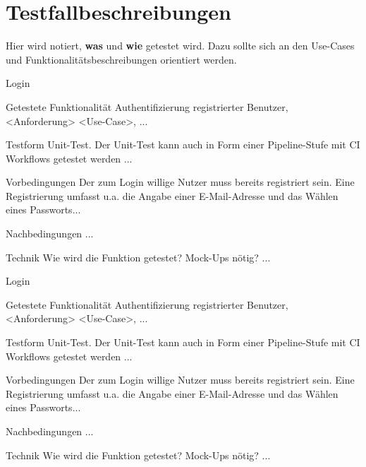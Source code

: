 \chapter{Testfallbeschreibungen}
\label{chap:test}

Hier wird notiert, \textbf{was} und \textbf{wie} getestet wird. Dazu sollte sich an den Use-Cases und Funktionalitätsbeschreibungen orientiert werden.

\begin{testcase}{10}{Login}
  \item[Getestete Funktionalität] Authentifizierung registrierter Benutzer, <Anforderung> <Use-Case>, ...
  \item[Testform] Unit-Test. Der Unit-Test kann auch in Form einer Pipeline-Stufe mit \gls{CI} Workflows getestet werden ...
  \item[Vorbedingungen] Der zum Login willige Nutzer muss bereits registriert sein. Eine Registrierung umfasst u.a. die Angabe einer E-Mail-Adresse und das Wählen eines Passworts...
  \item[Nachbedingungen] ...
  \item[Technik] Wie wird die Funktion getestet? Mock-Ups nötig? ...
\end{testcase}

\begin{testcase}{10}{Login}
  \item[Getestete Funktionalität] Authentifizierung registrierter Benutzer, <Anforderung> <Use-Case>, ...
  \item[Testform] Unit-Test. Der Unit-Test kann auch in Form einer Pipeline-Stufe mit \gls{CI} Workflows getestet werden ...
  \item[Vorbedingungen] Der zum Login willige Nutzer muss bereits registriert sein. Eine Registrierung umfasst u.a. die Angabe einer E-Mail-Adresse und das Wählen eines Passworts...
  \item[Nachbedingungen] ...
  \item[Technik] Wie wird die Funktion getestet? Mock-Ups nötig? ...
\end{testcase}
